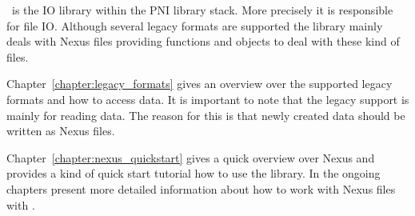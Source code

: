
\libpniio\ is the IO library within the PNI library stack. More precisely it is
responsible for file IO. Although several legacy formats are supported the
library mainly deals with Nexus files providing functions and objects to deal
with these kind of files. 

Chapter~\ref{chapter:legacy_formats} gives an overview over the supported legacy
formats and how to access data. It is important to note that the legacy support
is mainly for reading data. The reason for this is that newly created data
should be written as Nexus files. 

Chapter~\ref{chapter:nexus_quickstart} gives a quick overview over Nexus and
provides a kind of quick start tutorial how to use the library. 
In the ongoing chapters present more detailed information about how to work with
Nexus files with \libpniio.



